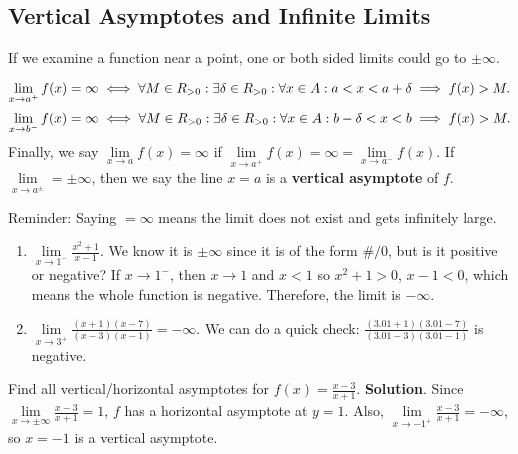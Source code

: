 \subsection{Vertical Asymptotes and Infinite Limits}
If we examine a function near a point, one or both sided limits could go to $ \pm\infty $.
\begin{Definition}{}{}
    \[ \lim\limits_{{x} \to {a^+}}f(x)=\infty\iff
        \forall M\in\relax{R}_{>0}:\exists \delta\in\relax{R}_{>0}:\forall x\in A: a<x<a+\delta\implies f(x)>M. \]
    \[ \lim\limits_{{x} \to {b^-}}f(x)=\infty\iff
        \forall M\in\relax{R}_{>0}:\exists \delta\in\relax{R}_{>0}:\forall x\in A: b-\delta<x<b\implies f(x)>M. \]
    Finally, we say $ \lim\limits_{{x} \to {a}}f(x)=\infty $ if
    $ \lim\limits_{{x} \to {a^+}}f(x)=\infty=\lim\limits_{{x} \to {a^-}}f(x) $.
    If $ \lim\limits_{{x} \to {a^\pm}}=\pm\infty $, then we say the line $ x=a $ is a \textbf{vertical asymptote} of $ f $.
\end{Definition}
\begin{Remark}{}{}
    Reminder: Saying $ =\infty $ means the limit does not exist and gets infinitely large.
\end{Remark}
\begin{Example}{}{}
    \begin{enumerate}[(1)]
        \item $ \displaystyle \lim\limits_{{x} \to {1^-}}\frac{x^2+1}{x-1} $. We know it is $ \pm\infty $ since it is of the form $ \#/0 $, but is it positive or negative?
              If $ x\to 1^- $, then $ x\to 1 $ and $ x<1 $ so $ x^2+1>0 $, $ x-1<0 $, which means the whole function is negative. Therefore,
              the limit is $ -\infty $.
        \item $ \displaystyle \lim\limits_{{x} \to {3^+}}\frac{(x+1)(x-7)}{(x-3)(x-1)}=-\infty $.
              We can do a quick check: $ \displaystyle \frac{(3.01+1)(3.01-7)}{(3.01-3)(3.01-1)} $ is negative.
    \end{enumerate}
\end{Example}
\begin{Example}{}{}
    Find all vertical/horizontal asymptotes for $ f(x)=\frac{x-3}{x+1} $.
    \tcblower{}
    \textbf{Solution}. Since $ \lim\limits_{{x} \to {\pm\infty}}\frac{x-3}{x+1}=1 $, $ f $ has a horizontal asymptote at $ y=1 $. Also,
    $ \lim\limits_{{x} \to {-1^+}}\frac{x-3}{x+1}=-\infty $, so $ x=-1 $ is a vertical asymptote.
\end{Example}
